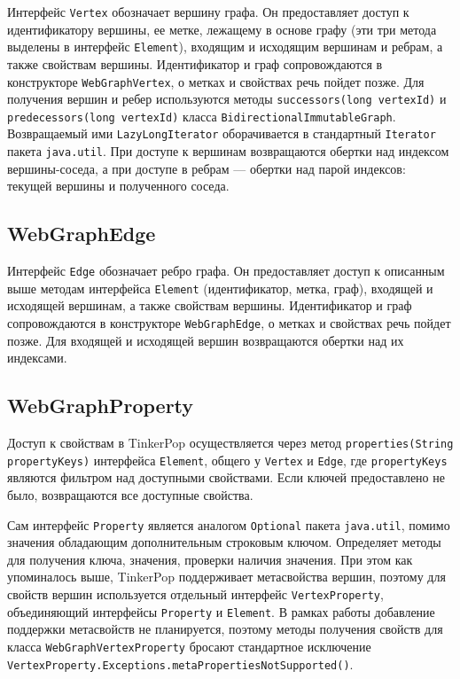 \documentclass[times,specification,annotation]{itmo-student-thesis}
\begin{document}
Интерфейс \texttt{Vertex} обозначает вершину графа. Он предоставляет доступ к идентификатору вершины, ее метке, лежащему в основе графу (эти три метода выделены в интерфейс \texttt{Element}), входящим и исходящим вершинам и ребрам, а также свойствам вершины.
Идентификатор и граф сопровождаются в конструкторе \texttt{WebGraphVertex}, о метках и свойствах речь пойдет позже.
Для получения вершин и ребер используются методы \texttt{successors(long vertexId)} и \texttt{predecessors(long vertexId)} класса \texttt{BidirectionalImmutableGraph}. Возвращаемый ими \texttt{LazyLongIterator} оборачивается в стандартный \texttt{Iterator} пакета \texttt{java.util}. При доступе к вершинам возвращаются обертки над индексом вершины-соседа, а при доступе в ребрам --- обертки над парой индексов: текущей вершины и полученного соседа.

\subsection{WebGraphEdge}

Интерфейс \texttt{Edge} обозначает ребро графа. Он предоставляет доступ к описанным выше методам интерфейса \texttt{Element} (идентификатор, метка, граф), входящей и исходящей вершинам, а также свойствам вершины. Идентификатор и граф сопровождаются в конструкторе \texttt{WebGraphEdge}, о метках и свойствах речь пойдет позже.
Для входящей и исходящей вершин возвращаются обертки над их индексами.

\subsection{WebGraphProperty}

Доступ к свойствам в TinkerPop осуществляется через метод \texttt{properties(String propertyKeys)} интерфейса \texttt{Element}, общего у \texttt{Vertex} и \texttt{Edge}, где \texttt{propertyKeys} являются фильтром над доступными свойствами. Если ключей предоставлено не было, возвращаются все доступные свойства.

Сам интерфейс \texttt{Property} является аналогом \texttt{Optional} пакета \texttt{java.util}, помимо значения обладающим дополнительным строковым ключом. Определяет методы для получения ключа, значения, проверки наличия значения. При этом как упоминалось выше, TinkerPop поддерживает метасвойства вершин, поэтому для свойств вершин используется отдельный интерфейс \texttt{VertexProperty}, объединяющий интерфейсы \texttt{Property} и \texttt{Element}. В рамках работы добавление поддержки метасвойств не планируется, поэтому методы получения свойств для класса \texttt{WebGraphVertexProperty} бросают стандартное исключение \texttt{VertexProperty.Exceptions.metaPropertiesNotSupported()}.
\end{document}

